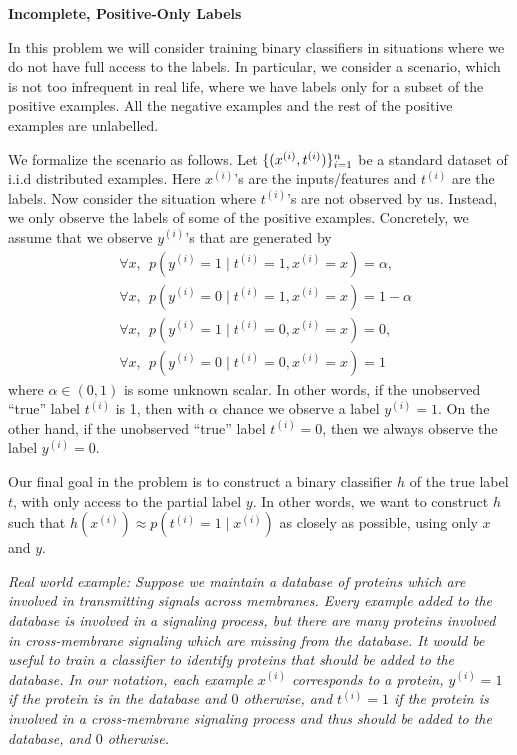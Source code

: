 \item {\bf Incomplete, Positive-Only Labels}

In this problem we will consider training binary classifiers in situations
where we do not have full access to the labels. In particular, we consider
a scenario, which is not too infrequent in real life, where we have labels
only for a subset of the positive examples. All the negative examples and
the rest of the positive examples are unlabelled.

We formalize the scenario as follows. Let $\{(x^{(i)}, t^{(i)})\}_{i=1}^{n}$ be a standard dataset of i.i.d distributed examples. Here $x^{(i)}$'s are the inputs/features and $t^{(i)}$ are the labels. Now consider the situation where $t^{(i)}$'s are not observed by us. Instead, we only observe the labels of some of the positive examples. Concretely, we assume that we observe  $y^{(i)}$'s that are generated by
\begin{align*}
& \forall  x, ~~ p(y^{(i)} = 1\mid t^{(i)}=1, x^{(i)}=x) = \alpha, \\
& \forall  x, ~~ p(y^{(i)} = 0 \mid t^{(i)}=1, x^{(i)}=x)  = 1- \alpha\\
& \forall  x, ~~ p(y^{(i)} = 1 \mid t^{(i)}=0, x^{(i)}=x) = 0,\\ 
& \forall  x, ~~ p(y^{(i)} = 0 \mid t^{(i)}=0, x^{(i)}=x) = 1
\end{align*}
where $\alpha \in (0,1)$ is some unknown scalar. In other words, if the unobserved ``true'' label $t^{(i)}$ is 1, then with $\alpha$ chance we observe a label $y^{(i)} = 1$. On the other hand, if the unobserved ``true'' label $t^{(i)} = 0$, then we always observe the label $y^{(i)} = 0$. 

Our final goal in the problem is to construct a binary classifier $h$ of
the true label $t$, with only access to the partial label $y$. In other words,
we want to construct $h$ such that
 $h(x^{(i)}) \approx p(t^{(i)} = 1\mid x^{(i)})$ as closely as
possible, using only $x$ and $y$.

\emph{Real world example: Suppose we maintain a database of proteins which
are involved in transmitting signals across membranes. Every example added to
the database is involved in a signaling process, but there are many proteins
involved in cross-membrane signaling which are missing from the database.
It would be useful to train a classifier to identify proteins that
should be added to the database. In our notation, each example $x^{(i)}$
corresponds to a protein, $y^{(i)} = 1$ if the protein is in the database and
$0$ otherwise, and $t^{(i)} = 1$ if the protein is involved in a cross-membrane
signaling process and thus should be added to the database, and $0$ otherwise.}



